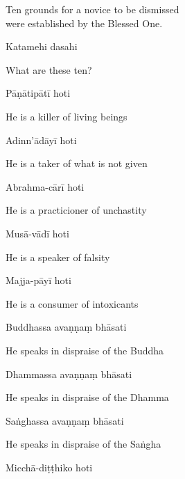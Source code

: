 \begin{cprenglish}
  Ten grounds for a novice to be dismissed\\
  were established by the Blessed One.
\end{cprenglish}

Katamehi dasahi

\begin{cprenglish}
  What are these ten?
\end{cprenglish}

Pāṇātipātī hoti

\begin{cprenglish}
  He is a killer of living beings
\end{cprenglish}

Adinn'ādāyī hoti

\begin{cprenglish}
  He is a taker of what is not given
\end{cprenglish}

Abrahma-cārī hoti

\begin{cprenglish}
  He is a practicioner of unchastity
\end{cprenglish}

Musā-vādī hoti

\begin{cprenglish}
  He is a speaker of falsity
\end{cprenglish}

Majja-pāyī hoti

\begin{cprenglish}
  He is a consumer of intoxicants
\end{cprenglish}

Buddhassa avaṇṇaṃ bhāsati

\begin{cprenglish}
  He speaks in dispraise of the Buddha
\end{cprenglish}

Dhammassa avaṇṇaṃ bhāsati

\begin{cprenglish}
  He speaks in dispraise of the Dhamma
\end{cprenglish}

Saṅghassa avaṇṇaṃ bhāsati

\begin{cprenglish}
  He speaks in dispraise of the Saṅgha
\end{cprenglish}

Micchā-diṭṭhiko hoti


